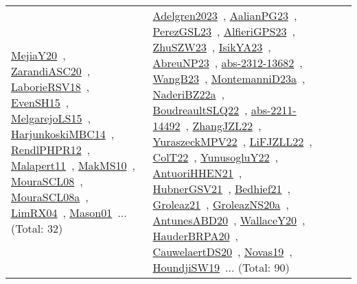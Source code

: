 {\begin{longtable}{lp{3cm}>{\raggedright\arraybackslash}p{6cm}>{\raggedright\arraybackslash}p{6cm}>{\raggedright\arraybackslash}p{8cm}}
\href{../works/MejiaY20.pdf}{MejiaY20}~\cite{MejiaY20}, \href{../works/ZarandiASC20.pdf}{ZarandiASC20}~\cite{ZarandiASC20}, \href{../works/LaborieRSV18.pdf}{LaborieRSV18}~\cite{LaborieRSV18}, \href{../works/EvenSH15.pdf}{EvenSH15}~\cite{EvenSH15}, \href{../works/MelgarejoLS15.pdf}{MelgarejoLS15}~\cite{MelgarejoLS15}, \href{../works/HarjunkoskiMBC14.pdf}{HarjunkoskiMBC14}~\cite{HarjunkoskiMBC14}, \href{../works/RendlPHPR12.pdf}{RendlPHPR12}~\cite{RendlPHPR12}, \href{../works/Malapert11.pdf}{Malapert11}~\cite{Malapert11}, \href{../works/MakMS10.pdf}{MakMS10}~\cite{MakMS10}, \href{../works/MouraSCL08.pdf}{MouraSCL08}~\cite{MouraSCL08}, \href{../works/MouraSCL08a.pdf}{MouraSCL08a}~\cite{MouraSCL08a}, \href{../works/LimRX04.pdf}{LimRX04}~\cite{LimRX04}, \href{../works/Mason01.pdf}{Mason01}~\cite{Mason01}... (Total: 32) & \href{../works/Adelgren2023.pdf}{Adelgren2023}~\cite{Adelgren2023}, \href{../works/AalianPG23.pdf}{AalianPG23}~\cite{AalianPG23}, \href{../works/PerezGSL23.pdf}{PerezGSL23}~\cite{PerezGSL23}, \href{../works/AlfieriGPS23.pdf}{AlfieriGPS23}~\cite{AlfieriGPS23}, \href{../works/ZhuSZW23.pdf}{ZhuSZW23}~\cite{ZhuSZW23}, \href{../works/IsikYA23.pdf}{IsikYA23}~\cite{IsikYA23}, \href{../works/AbreuNP23.pdf}{AbreuNP23}~\cite{AbreuNP23}, \href{../works/abs-2312-13682.pdf}{abs-2312-13682}~\cite{abs-2312-13682}, \href{../works/WangB23.pdf}{WangB23}~\cite{WangB23}, \href{../works/MontemanniD23a.pdf}{MontemanniD23a}~\cite{MontemanniD23a}, \href{../works/NaderiBZ22a.pdf}{NaderiBZ22a}~\cite{NaderiBZ22a}, \href{../works/BoudreaultSLQ22.pdf}{BoudreaultSLQ22}~\cite{BoudreaultSLQ22}, \href{../works/abs-2211-14492.pdf}{abs-2211-14492}~\cite{abs-2211-14492}, \href{../works/ZhangJZL22.pdf}{ZhangJZL22}~\cite{ZhangJZL22}, \href{../works/YuraszeckMPV22.pdf}{YuraszeckMPV22}~\cite{YuraszeckMPV22}, \href{../works/LiFJZLL22.pdf}{LiFJZLL22}~\cite{LiFJZLL22}, \href{../works/ColT22.pdf}{ColT22}~\cite{ColT22}, \href{../works/YunusogluY22.pdf}{YunusogluY22}~\cite{YunusogluY22}, \href{../works/AntuoriHHEN21.pdf}{AntuoriHHEN21}~\cite{AntuoriHHEN21}, \href{../works/HubnerGSV21.pdf}{HubnerGSV21}~\cite{HubnerGSV21}, \href{../works/Bedhief21.pdf}{Bedhief21}~\cite{Bedhief21}, \href{../works/Groleaz21.pdf}{Groleaz21}~\cite{Groleaz21}, \href{../works/GroleazNS20a.pdf}{GroleazNS20a}~\cite{GroleazNS20a}, \href{../works/AntunesABD20.pdf}{AntunesABD20}~\cite{AntunesABD20}, \href{../works/WallaceY20.pdf}{WallaceY20}~\cite{WallaceY20}, \href{../works/HauderBRPA20.pdf}{HauderBRPA20}~\cite{HauderBRPA20}, \href{../works/CauwelaertDS20.pdf}{CauwelaertDS20}~\cite{CauwelaertDS20}, \href{../works/Novas19.pdf}{Novas19}~\cite{Novas19}, \href{../works/HoundjiSW19.pdf}{HoundjiSW19}~\cite{HoundjiSW19}... (Total: 90)\\

\end{longtable}}
